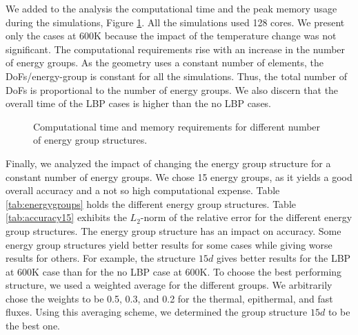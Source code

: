 \documentclass[11pt,letterpaper]{article}
\begin{document}
We added to the analysis the computational time and the peak memory usage during the simulations, Figure \ref{fig:assembly-time}.
All the simulations used 128 cores.
We present only the cases at 600K because the impact of the temperature change was not significant.
The computational requirements rise with an increase in the number of energy groups.
As the geometry uses a constant number of elements, the DoFs/energy-group is constant for all the simulations.
Thus, the total number of DoFs is proportional to the number of energy groups.
We also discern that the overall time of the LBP cases is higher than the no LBP cases.

\begin{figure}[htbp!]
	\centering
	\hfill
	\caption{Computational time and memory requirements for different number of energy group structures.}
	\label{fig:assembly-time}
\end{figure}

Finally, we analyzed the impact of changing the energy group structure for a constant number of energy groups.
We chose 15 energy groups, as it yields a good overall accuracy and a not so high computational expense.
Table \ref{tab:energygroups} holds the different energy group structures.
Table \ref{tab:accuracy15} exhibits the $L_2$-norm of the relative error for the different energy group structures.
The energy group structure has an impact on accuracy.
Some energy group structures yield better results for some cases while giving worse results for others.
For example, the structure $15d$ gives better results for the LBP at 600K case than for the no LBP case at 600K.
To choose the best performing structure, we used a weighted average for the different groups.
We arbitrarily chose the weights to be 0.5, 0.3, and 0.2 for the thermal, epithermal, and fast fluxes.
Using this averaging scheme, we determined the group structure $15d$ to be the best one.
\end{document}
